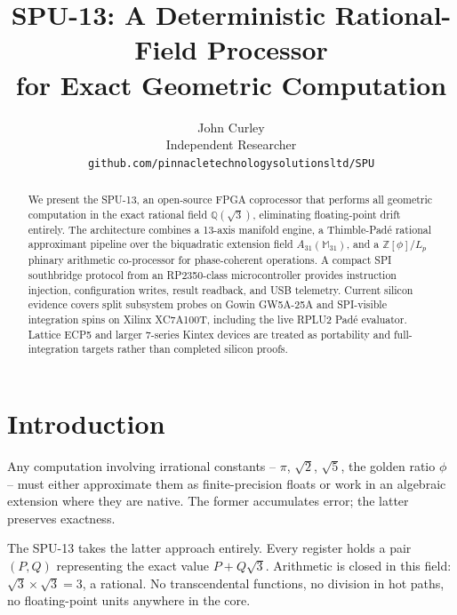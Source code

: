 \documentclass[10pt,twocolumn]{article}
\title{SPU-13: A Deterministic Rational-Field Processor \\
       for Exact Geometric Computation}
\author{John Curley \\
        Independent Researcher \\
        \texttt{github.com/pinnacletechnologysolutionsltd/SPU}}
\begin{document}
\maketitle

\begin{abstract}
We present the SPU-13, an open-source FPGA coprocessor that performs all
geometric computation in the exact rational field $\mathbb{Q}(\sqrt{3})$,
eliminating floating-point drift entirely. The architecture combines a 13-axis
manifold engine, a Thimble-Pad\'e rational approximant pipeline over the
biquadratic extension field $A_{31}(\mathbb{M}_{31})$, and a
$\mathbb{Z}[\phi]/L_p$ phinary arithmetic co-processor for phase-coherent
operations. A compact SPI southbridge protocol from an RP2350-class
microcontroller provides instruction injection, configuration writes, result
readback, and USB telemetry. Current silicon evidence covers split subsystem
probes on Gowin GW5A-25A and SPI-visible integration spins on Xilinx
XC7A100T, including the live RPLU2 Pad\'e evaluator. Lattice ECP5 and larger
7-series Kintex devices are treated as portability and full-integration
targets rather than completed silicon proofs.
\end{abstract}

\section{Introduction}
\label{sec:introduction}

Any computation involving irrational constants -- $\pi$, $\sqrt{2}$, $\sqrt{5}$,
the golden ratio $\phi$ -- must either approximate them as finite-precision
floats or work in an algebraic extension where they are native. The former
accumulates error; the latter preserves exactness.\cite{wildberger2005}

The SPU-13 takes the latter approach entirely. Every register holds a pair
$(P,Q)$ representing the exact value $P+Q\sqrt{3}$. Arithmetic is closed in
this field: $\sqrt{3}\times\sqrt{3}=3$, a rational. No transcendental
functions, no division in hot paths, no floating-point units anywhere in the
core.

\end{document}
